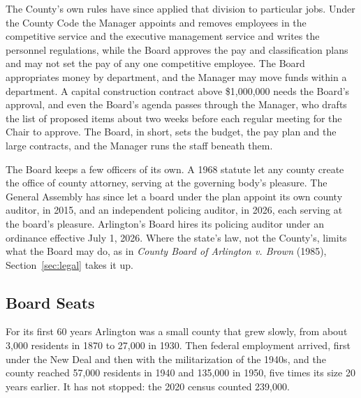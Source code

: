 The County's own rules have since applied that division to particular jobs.
Under the County Code the Manager appoints and removes employees in the
competitive service and the executive management service and writes the
personnel regulations, while the Board approves the pay and classification plans
and may not set the pay of any one competitive
employee.\autocite{arlingtoncode6civilservice} The Board appropriates money by
department, and the Manager may move funds within a
department.\autocite{arlingtonva2026budgetresolution} A capital construction
contract above \$1,000,000 needs the Board's
approval,\autocite{arlingtonva2025purchasingresolution} and even the Board's
agenda passes through the Manager, who drafts the list of proposed items about
two weeks before each regular meeting for the Chair to
approve.\autocite{arlingtonva2026procedures} The Board, in short, sets the
budget, the pay plan and the large contracts, and the Manager runs the staff
beneath them.

The Board keeps a few officers of its own. A 1968 statute let any county create
the office of county attorney, serving at the governing body's
pleasure.\autocite{vaacts1968c695} The General Assembly has since let a board under
the plan appoint its own county auditor, in 2015, and an independent policing
auditor, in 2026, each serving at the board's
pleasure.\autocite{vacode1527092,vaacts2026c372} Arlington's Board hires its
policing auditor under an ordinance effective July 1,
2026.\autocite{arlingtoncode69oversight} Where the state's law, not
the County's, limits what the Board may do, as in \textit{County Board of
Arlington v. Brown} (1985), Section~\ref{sec:legal} takes it up.

\subsection{Board Seats}

For its first 60 years Arlington was a small county that grew slowly, from about
3,000 residents in 1870 to 27,000 in 1930. Then federal employment arrived, first
under the New Deal and then with the militarization of the 1940s, and the county
reached 57,000 residents in 1940 and 135,000 in 1950, five times its size 20
years earlier.\autocite[239--40, 248]{bestebreurtje2017} It has not stopped: the
2020 census counted 239,000.

